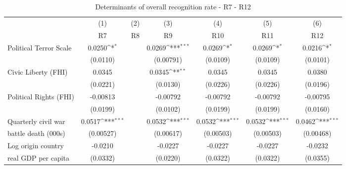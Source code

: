 \begin{table}[!ht]\centering \scriptsize
\def\sym#1{\ifmmode^{#1}\else\(^{#1}\)\fi}
\caption{Determinants of overall recognition rate - R7 - R12}
\begin{tabular}{l*{6}{c}}
\hline\hline
	&\multicolumn{1}{c}{(1)}     &\multicolumn{1}{c}{(2)}       &\multicolumn{1}{c}{(3)}       &\multicolumn{1}{c}{(4)}    	&\multicolumn{1}{c}{(5)}  	&\multicolumn{1}{c}{(6)}   \\
                    &\multicolumn{1}{c}{R7}&\multicolumn{1}{c}{R8}&\multicolumn{1}{c}{R9}&\multicolumn{1}{c}{R10}&\multicolumn{1}{c}{R11}&\multicolumn{1}{c}{R12}\\                   
\hline
Political Terror Scale&      0.0250\sym{*}  &                     &      0.0269\sym{***}&      0.0269\sym{*}  &      0.0269\sym{*}  &      0.0216\sym{*}  \\
                    &    (0.0110)         &                     &   (0.00791)         &    (0.0109)         &    (0.0109)         &    (0.0101)         \\
[0,5em]
Civic Liberty (FHI) &      0.0345         &                     &      0.0345\sym{**} &      0.0345         &      0.0345         &      0.0380         \\
                    &    (0.0221)         &                     &    (0.0130)         &    (0.0226)         &    (0.0226)         &    (0.0196)         \\
[0,5em]
Political Rights (FHI)&    -0.00813         &                     &    -0.00792         &    -0.00792         &    -0.00792         &    -0.00795         \\
                    &    (0.0199)         &                     &    (0.0102)         &    (0.0199)         &    (0.0199)         &    (0.0160)         \\
[0,5em]
Quarterly civil war &      0.0517\sym{***}&                     &      0.0532\sym{***}&      0.0532\sym{***}&      0.0532\sym{***}&      0.0462\sym{***}\\
battle death (000s)                    &   (0.00527)         &                     &   (0.00617)         &   (0.00503)         &   (0.00503)         &   (0.00468)         \\
[0,5em]
Log origin country &     -0.0210         &                     &     -0.0227         &     -0.0227         &     -0.0227         &     -0.0232         \\
real GDP per capita                    &    (0.0332)         &                     &    (0.0220)         &    (0.0322)         &    (0.0322)         &    (0.0355)         \\

\end{tabular}
\end{table}
